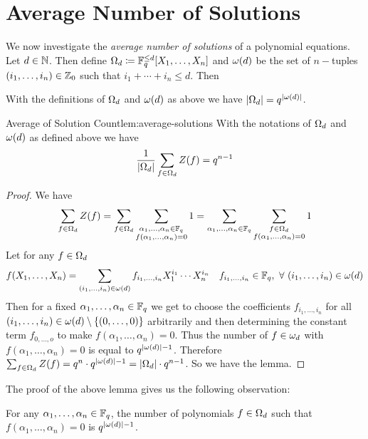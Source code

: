 \section{Average Number of Solutions}\label{sec:average-solutions}
We now investigate the \emph{average number of solutions} of a polynomial equations. Let $d\in\mathbb{N}$. Then define $\Omega_d\coloneqq \mathbb{F}_q^{\leq d}[X_1,\dots, X_n]$ and $\omega(d)$ be the set of $n-$tuples $(i_1,\dots,i_n)\in\mathbb{Z}_0$ such that $i_1+\cdots +i_n\leq d$. Then 
\begin{observation}\label{obs:Omd-omd}
  With the definitions of $\Omega_d$ and $\omega(d)$ as above we have $|\Omega_d|=q^{|\omega(d)|}$. 
\end{observation}
\begin{lemma}{Average of Solution Count}{lem:average-solutions}
  With the notations of $\Omega_d$ and $\omega(d)$ as defined above we have $$\frac1{|\Omega_d|}\sum_{f\in\Omega_d}Z(f)=q^{n-1}$$
\end{lemma}
\begin{proof}
  We have $$\sum_{f\in\Omega_d}Z(f)=\sum_{f\in\Omega_d}\sum_{\substack{\alpha_1,\dots,\alpha_n\in\mathbb{F}_q\\ f(\alpha_1,\dots,\alpha_n)=0}}1=\sum_{\alpha_1,\dots,\alpha_n\in\mathbb{F}_q}\sum_{\substack{f\in\Omega_d\\ f(\alpha_1,\dots,\alpha_n)=0}}1$$Let for any $f\in\Omega_d$ $$f(X_1,\dots,X_n)=\sum_{(i_1,\dots,i_n)\in\omega(d)}f_{i_1,\dots,i_n}X_1^{i_1}\cdots X_n^{i_n}\quad f_{i_1,\dots,i_n}\in\mathbb{F}_q,\ \forall\ (i_1,\dots, i_n)\in\omega(d)$$Then for a fixed $\alpha_1,\dots, \alpha_n\in\mathbb{F}_q$ we get to choose the coefficients $f_{i_1,\dots, i_n}$ for all $(i_1,\dots,i_n)\in\omega(d)\setminus\{(0,\dots, 0)\}$ arbitrarily and then determining the constant term $f_{0,\dots, o}$ to make $f(\alpha_1,\dots,\alpha_n)=0$. Thus the number of $f\in\omega_d$ with $f(\alpha_1,\dots, \alpha_n)=0$ is equal to $q^{|\omega(d)|-1}$. Therefore $\sum_{f\in\Omega_d}Z(f)=q^n\cdot q^{|\omega(d)|-1}=|\Omega_d|\cdot q^{n-1}$. So we have the lemma. 
\end{proof}
The proof of the above lemma gives us the following observation:
\begin{observation}\label{obs:num-poly-zero-at-point}
  For any $\alpha_1,\dots,\alpha_n\in\mathbb{F}_q$, the number of polynomials $f\in\Omega_d$ such that $f(\alpha_1,\dots,\alpha_n)=0$ is $q^{|\omega(d)|-1}$. 
\end{observation}


